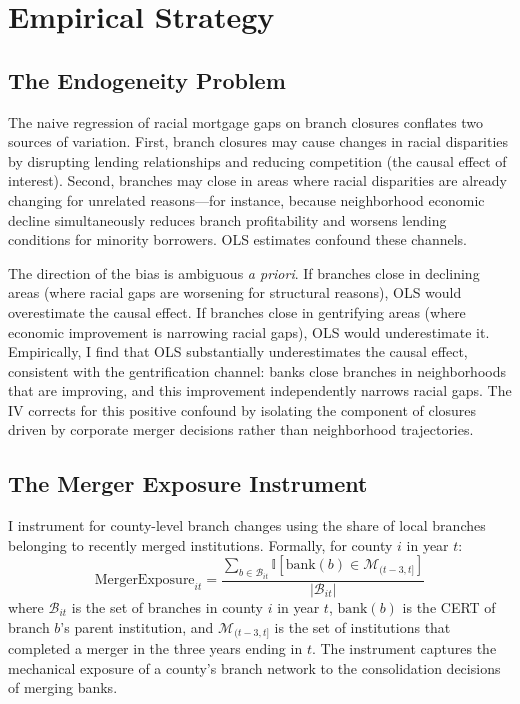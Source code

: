 \documentclass[12pt]{article}
\newcommand{\ind}{\mathbb{I}}
\begin{document}



\section{Empirical Strategy}
\label{sec:strategy}

\subsection{The Endogeneity Problem}

The naive regression of racial mortgage gaps on branch closures conflates two sources of variation. First, branch closures may cause changes in racial disparities by disrupting lending relationships and reducing competition (the causal effect of interest). Second, branches may close in areas where racial disparities are already changing for unrelated reasons---for instance, because neighborhood economic decline simultaneously reduces branch profitability and worsens lending conditions for minority borrowers. OLS estimates confound these channels.

The direction of the bias is ambiguous \emph{a priori}. If branches close in declining areas (where racial gaps are worsening for structural reasons), OLS would overestimate the causal effect. If branches close in gentrifying areas (where economic improvement is narrowing racial gaps), OLS would underestimate it. Empirically, I find that OLS substantially underestimates the causal effect, consistent with the gentrification channel: banks close branches in neighborhoods that are improving, and this improvement independently narrows racial gaps. The IV corrects for this positive confound by isolating the component of closures driven by corporate merger decisions rather than neighborhood trajectories.

\subsection{The Merger Exposure Instrument}

I instrument for county-level branch changes using the share of local branches belonging to recently merged institutions. Formally, for county $i$ in year $t$:
\begin{equation}
\text{MergerExposure}_{it} = \frac{\sum_{b \in \mathcal{B}_{it}} \ind[\text{bank}(b) \in \mathcal{M}_{(t-3,t]}]}{|\mathcal{B}_{it}|}
\label{eq:instrument}
\end{equation}
where $\mathcal{B}_{it}$ is the set of branches in county $i$ in year $t$, $\text{bank}(b)$ is the CERT of branch $b$'s parent institution, and $\mathcal{M}_{(t-3,t]}$ is the set of institutions that completed a merger in the three years ending in $t$. The instrument captures the mechanical exposure of a county's branch network to the consolidation decisions of merging banks.
\end{document}
